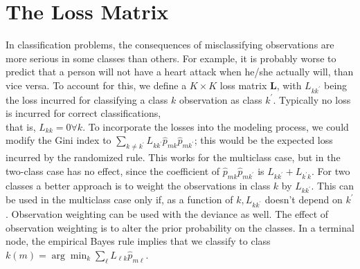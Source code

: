 \documentclass[10pt]{article}
\begin{document}
\section*{The Loss Matrix}
In classification problems, the consequences of misclassifying observations are more serious in some classes than others. For example, it is probably worse to predict that a person will not have a heart attack when he/she actually will, than vice versa. To account for this, we define a $K \times K$ loss matrix $\mathbf{L}$, with $L_{k k^{\prime}}$ being the loss incurred for classifying a class $k$ observation as class $k^{\prime}$. Typically no loss is incurred for correct classifications,\\
that is, $L_{k k}=0 \forall k$. To incorporate the losses into the modeling process, we could modify the Gini index to $\sum_{k \neq k^{\prime}} L_{k k^{\prime}} \hat{p}_{m k} \hat{p}_{m k^{\prime}}$; this would be the expected loss incurred by the randomized rule. This works for the multiclass case, but in the two-class case has no effect, since the coefficient of $\hat{p}_{m k} \hat{p}_{m k^{\prime}}$ is $L_{k k^{\prime}}+L_{k^{\prime} k}$. For two classes a better approach is to weight the observations in class $k$ by $L_{k k^{\prime}}$. This can be used in the multiclass case only if, as a function of $k, L_{k k^{\prime}}$ doesn't depend on $k^{\prime}$. Observation weighting can be used with the deviance as well. The effect of observation weighting is to alter the prior probability on the classes. In a terminal node, the empirical Bayes rule implies that we classify to class $k(m)=\arg \min _{k} \sum_{\ell} L_{\ell k} \hat{p}_{m \ell}$.
\end{document}
